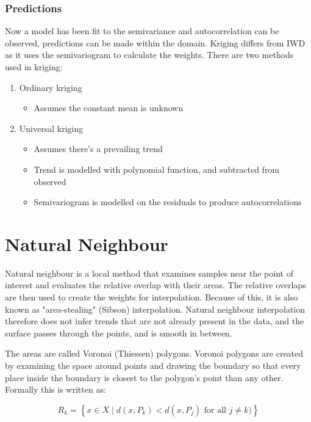 \documentclass{article}
\begin{document}
\subsubsection{Predictions}

Now a model has been fit to the semivariance and autocorrelation can be observed, predictions can be made within the domain.
Kriging differs from IWD as it uses the semivariogram to calculate the weights.
There are two methods used in kriging:

\begin{enumerate}
    \item Ordinary kriging
    \begin{itemize}
        \item Assumes the constant mean is unknown
    \end{itemize}
    \item Universal kriging
    \begin{itemize}
        \item Assumes there's a prevailing trend
        \item Trend is modelled with polynomial function, and subtracted from observed
        \item Semivariogram is modelled on the residuals to produce autocorrelations
    \end{itemize}
\end{enumerate}

\section{Natural Neighbour}

Natural neighbour is a local method that examines samples near the point of interest and evaluates the relative overlap with their areas.
The relative overlaps are then used to create the weights for interpolation.
Because of this, it is also known as "area-stealing" (Sibson) interpolation.
Natural neighbour interpolation therefore does not infer trends that are not already present in the data, and the surface passes through the points, and is smooth in between.

The areas are called Voronoi (Thiessen) polygons.
Voronoi polygons are created by examining the space around points and drawing the boundary so that every place inside the boundary is closest to the polygon's point than any other.
Formally this is written as:

\[R_{k} = \left\{x \in X \mid d(x, P_{k}) < d(x, P_{j}) \text{ for all } j \neq k)\right\}\]
\end{document}
